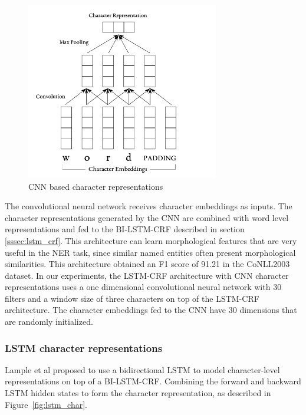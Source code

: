 \documentclass{nle}
\begin{document}
\begin{figure}[h]
  \centering
	  \includegraphics[width=0.75\textwidth]{pics/cnn}
  \caption{CNN based character representations}
  \label{fig:cnn}
\end{figure}

The convolutional neural network receives character embeddings as inputs. The character 
representations generated by the CNN are combined with word level representations 
and fed to the BI-LSTM-CRF described in section \ref{sssec:lstm_crf}.
This architecture can learn morphological features that are very
useful in the NER task, since similar named entities often present morphological similarities. 
This architecture obtained an F1 score of 91.21 in the CoNLL2003 dataset. In our experiments, 
the LSTM-CRF architecture with CNN character representations uses a one dimensional convolutional 
neural network with 30 filters and a window size of three characters on top of the LSTM-CRF 
architecture. The character embeddings fed to the CNN have 30 dimensions that are randomly 
initialized.

\subsubsection{LSTM character representations}

Lample et al  proposed to use a bidirectional LSTM to model character-level 
representations on top of a BI-LSTM-CRF. Combining the forward and backward LSTM hidden states 
to form the character representation, as described in Figure~\ref{fig:lstm_char}. 
\end{document}
